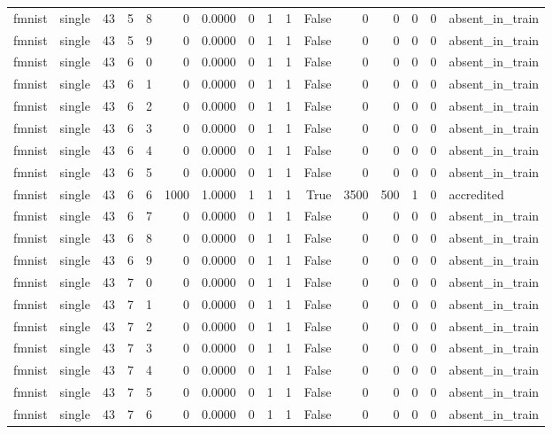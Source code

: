 \begin{tabular}{llrrrrrrrrrrrrrl}
fmnist & single & 43 & 5 & 8 & 0 & 0.0000 & 0 & 1 & 1 & False & 0 & 0 & 0 & 0 & absent\_in\_train \\
fmnist & single & 43 & 5 & 9 & 0 & 0.0000 & 0 & 1 & 1 & False & 0 & 0 & 0 & 0 & absent\_in\_train \\
fmnist & single & 43 & 6 & 0 & 0 & 0.0000 & 0 & 1 & 1 & False & 0 & 0 & 0 & 0 & absent\_in\_train \\
fmnist & single & 43 & 6 & 1 & 0 & 0.0000 & 0 & 1 & 1 & False & 0 & 0 & 0 & 0 & absent\_in\_train \\
fmnist & single & 43 & 6 & 2 & 0 & 0.0000 & 0 & 1 & 1 & False & 0 & 0 & 0 & 0 & absent\_in\_train \\
fmnist & single & 43 & 6 & 3 & 0 & 0.0000 & 0 & 1 & 1 & False & 0 & 0 & 0 & 0 & absent\_in\_train \\
fmnist & single & 43 & 6 & 4 & 0 & 0.0000 & 0 & 1 & 1 & False & 0 & 0 & 0 & 0 & absent\_in\_train \\
fmnist & single & 43 & 6 & 5 & 0 & 0.0000 & 0 & 1 & 1 & False & 0 & 0 & 0 & 0 & absent\_in\_train \\
fmnist & single & 43 & 6 & 6 & 1000 & 1.0000 & 1 & 1 & 1 & True & 3500 & 500 & 1 & 0 & accredited \\
fmnist & single & 43 & 6 & 7 & 0 & 0.0000 & 0 & 1 & 1 & False & 0 & 0 & 0 & 0 & absent\_in\_train \\
fmnist & single & 43 & 6 & 8 & 0 & 0.0000 & 0 & 1 & 1 & False & 0 & 0 & 0 & 0 & absent\_in\_train \\
fmnist & single & 43 & 6 & 9 & 0 & 0.0000 & 0 & 1 & 1 & False & 0 & 0 & 0 & 0 & absent\_in\_train \\
fmnist & single & 43 & 7 & 0 & 0 & 0.0000 & 0 & 1 & 1 & False & 0 & 0 & 0 & 0 & absent\_in\_train \\
fmnist & single & 43 & 7 & 1 & 0 & 0.0000 & 0 & 1 & 1 & False & 0 & 0 & 0 & 0 & absent\_in\_train \\
fmnist & single & 43 & 7 & 2 & 0 & 0.0000 & 0 & 1 & 1 & False & 0 & 0 & 0 & 0 & absent\_in\_train \\
fmnist & single & 43 & 7 & 3 & 0 & 0.0000 & 0 & 1 & 1 & False & 0 & 0 & 0 & 0 & absent\_in\_train \\
fmnist & single & 43 & 7 & 4 & 0 & 0.0000 & 0 & 1 & 1 & False & 0 & 0 & 0 & 0 & absent\_in\_train \\
fmnist & single & 43 & 7 & 5 & 0 & 0.0000 & 0 & 1 & 1 & False & 0 & 0 & 0 & 0 & absent\_in\_train \\
fmnist & single & 43 & 7 & 6 & 0 & 0.0000 & 0 & 1 & 1 & False & 0 & 0 & 0 & 0 & absent\_in\_train \\

\end{tabular}

